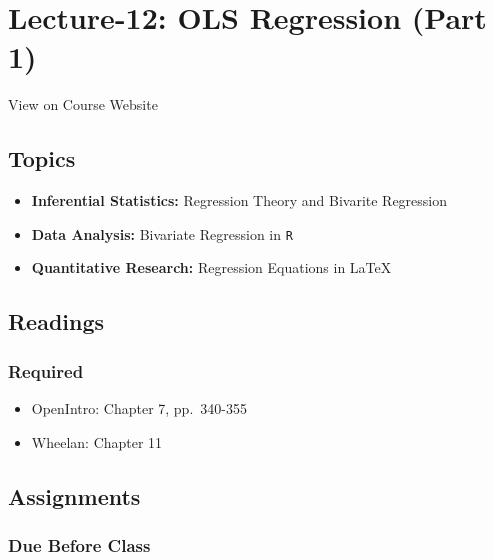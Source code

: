 \documentclass[]{book}
\providecommand{\tightlist}{%
  \setlength{\itemsep}{0pt}\setlength{\parskip}{0pt}}
\theoremstyle{definition}
\theoremstyle{definition}
\theoremstyle{definition}
\theoremstyle{remark}
\begin{document}
\hypertarget{lecture-12-ols-regression-part-1}{%
\section*{Lecture-12: OLS Regression (Part
1)}\label{lecture-12-ols-regression-part-1}}

View on Course Website

\hypertarget{topics-12}{%
\subsection*{Topics}\label{topics-12}}

\begin{itemize}
\tightlist
\item
  \textbf{Inferential Statistics:} Regression Theory and Bivarite
  Regression
\item
  \textbf{Data Analysis:} Bivariate Regression in \texttt{R}
\item
  \textbf{Quantitative Research:} Regression Equations in LaTeX
\end{itemize}

\hypertarget{readings-13}{%
\subsection*{Readings}\label{readings-13}}

\hypertarget{required-13}{%
\subsubsection*{Required}\label{required-13}}

\begin{itemize}
\tightlist
\item
  OpenIntro: Chapter 7, pp.~340-355
\item
  Wheelan: Chapter 11
\end{itemize}

\hypertarget{assignments-13}{%
\subsection*{Assignments}\label{assignments-13}}

\hypertarget{due-before-class-11}{%
\subsubsection*{Due Before Class}\label{due-before-class-11}}
\end{document}
